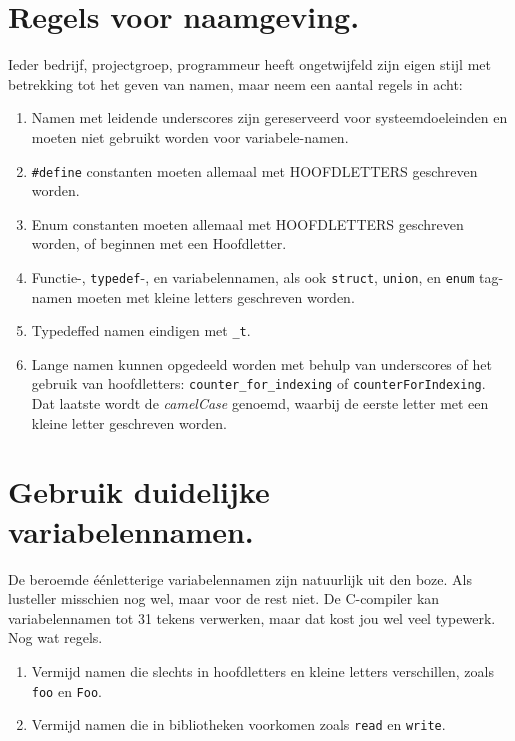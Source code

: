 \documentclass[12pt,a4paper,final,twoside,fleqn]{article}
\def\lstC{\lstinline[style=C]}
\begin{document}
\section{Regels voor naamgeving.}
Ieder bedrijf, projectgroep, programmeur heeft ongetwijfeld zijn eigen stijl
met betrekking tot het geven van namen, maar neem een aantal regels in acht:

\begin{enumerate}[labelsep=1em,align=right,itemsep=0cm,leftmargin=*,label=\Roman*.]
\item Namen met leidende underscores zijn gereserveerd voor systeemdoeleinden
en moeten niet gebruikt worden voor variabele-namen.
\item \lstC{#define} constanten moeten allemaal met HOOFDLETTERS geschreven
worden.
\item Enum constanten moeten allemaal met HOOFDLETTERS geschreven worden, of
beginnen met een Hoofdletter.
\item Functie-, \lstC{typedef}-, en variabelennamen, als ook \lstC{struct},
\lstC{union}, en \lstC{enum} tag-namen moeten met kleine letters geschreven worden.
\item Typedeffed namen eindigen met \lstC{_t}.
\item Lange namen kunnen opgedeeld worden met behulp van underscores of het
gebruik van hoofdletters: \lstC{counter_for_indexing} of \lstC{counterForIndexing}.
Dat laatste wordt de \textsl{camelCase} genoemd, waarbij de eerste
letter met een kleine letter geschreven worden.
\end{enumerate}


\section{Gebruik duidelijke variabelennamen.}
De beroemde \'{e}\'{e}nletterige variabelennamen zijn natuurlijk uit den boze.
Als lusteller misschien nog wel, maar voor de rest niet. De C-compiler kan
variabelennamen tot 31 tekens verwerken\cite{isocdraft2005}, maar dat kost jou wel
veel typewerk. Nog wat regels.

\begin{enumerate}[labelsep=1em,align=right,itemsep=0cm,leftmargin=*,label=\Roman*.]
\item Vermijd namen die slechts in hoofdletters en kleine letters verschillen,
  zoals \lstC{foo} en \lstC{Foo}.
\item Vermijd namen die in bibliotheken voorkomen zoals \lstC{read} en \lstC{write}.
\end{enumerate}
\end{document}
